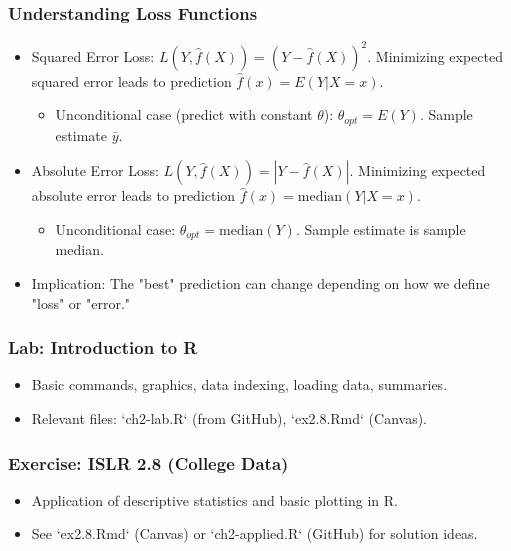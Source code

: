 \documentclass[12pt,a4paper]{article}
\begin{document}
    \subsubsection{Understanding Loss Functions }
        \begin{itemize}
            \item Squared Error Loss: $L(Y, \hat{f}(X)) = (Y - \hat{f}(X))^2$. Minimizing expected squared error leads to prediction $\hat{f}(x) = E(Y|X=x)$.
                \begin{itemize}
                    \item Unconditional case (predict with constant $\theta$): $\theta_{opt} = E(Y)$. Sample estimate $\bar{y}$.
                \end{itemize}
            \item Absolute Error Loss: $L(Y, \hat{f}(X)) = |Y - \hat{f}(X)|$. Minimizing expected absolute error leads to prediction $\hat{f}(x) = \text{median}(Y|X=x)$.
                \begin{itemize}
                    \item Unconditional case: $\theta_{opt} = \text{median}(Y)$. Sample estimate is sample median.
                \end{itemize}
            \item Implication: The "best" prediction can change depending on how we define "loss" or "error."
        \end{itemize}

    \subsubsection{Lab: Introduction to R }
        \begin{itemize}
            \item Basic commands, graphics, data indexing, loading data, summaries.
            \item Relevant files: `ch2-lab.R` (from GitHub), `ex2.8.Rmd` (Canvas).
        \end{itemize}

    \subsubsection{Exercise: ISLR 2.8 (College Data)}
        \begin{itemize}
            \item Application of descriptive statistics and basic plotting in R.
            \item See `ex2.8.Rmd` (Canvas) or `ch2-applied.R` (GitHub) for solution ideas.
        \end{itemize}
\end{document}
